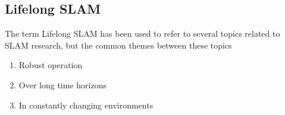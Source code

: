 \subsection{Lifelong SLAM}

The term Lifelong SLAM has been used to refer to several topics related to SLAM research, but the common themes between these topics 
\begin{singlespace}
    \begin{enumerate}
        \item Robust operation
        \item Over long time horizons
        \item In constantly changing environments
    \end{enumerate}
\end{singlespace}